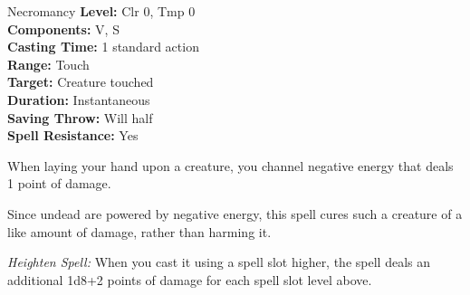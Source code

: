 {Necromancy}
{
	\textbf{Level:}
	Clr 0, Tmp 0\\
	\textbf{Components:}
	V, S\\
	\textbf{Casting Time:}
	1 standard action\\
	\textbf{Range:}
	Touch\\
	\textbf{Target:}
	Creature touched\\
	\textbf{Duration:}
	Instantaneous\\
	\textbf{Saving Throw:}
	Will half\\
	\textbf{Spell Resistance:}
	Yes\\
}
{
	When laying your hand upon a creature, you channel negative energy that deals 1 point of damage.

	Since undead are powered by negative energy, this spell cures such a creature of a like amount of damage, rather than harming it.

	\textit{Heighten Spell:} When you cast it using a spell slot higher, the spell deals an additional 1d8+2 points of damage for each spell slot level above.
}
